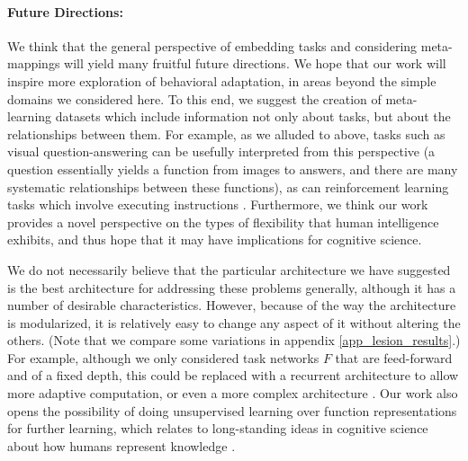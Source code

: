 \documentclass{article}
\begin{document}
\paragraph{Future Directions:} We think that the general perspective of embedding tasks and considering meta-mappings will yield many fruitful future directions. We hope that our work will inspire more exploration of behavioral adaptation, in areas beyond the simple domains we considered here. To this end, we suggest the creation of meta-learning datasets which include information not only about tasks, but about the relationships between them. For example, as we alluded to above, tasks such as visual question-answering \citep[e.g.][]{Antol2015} can be usefully interpreted from this perspective (a question essentially yields a function from images to answers, and there are many systematic relationships between these functions), as can reinforcement learning tasks which involve executing instructions \citep[e.g.][]{Hermann2017, Co-Reyes2019}. Furthermore, we think our work provides a novel perspective on the types of flexibility that human intelligence exhibits, and thus hope that it may have implications for cognitive science. \par 
We do not necessarily believe that the particular architecture we have suggested is the best architecture for addressing these problems generally, although it has a number of desirable characteristics. However, because of the way the architecture is modularized, it is relatively easy to change any aspect of it without altering the others. (Note that we compare some variations in appendix \ref{app_lesion_results}.) For example, although we only considered task networks $F$ that are feed-forward and of a fixed depth, this could be replaced with a recurrent architecture to allow more adaptive computation, or even a more complex architecture \citep[e.g.][]{Reed2015, Graves2016}. Our work also opens the possibility of doing unsupervised learning over function representations for further learning, which relates to long-standing ideas in cognitive science about how humans represent knowledge \citep{Clark1993}. \par 
\end{document}
